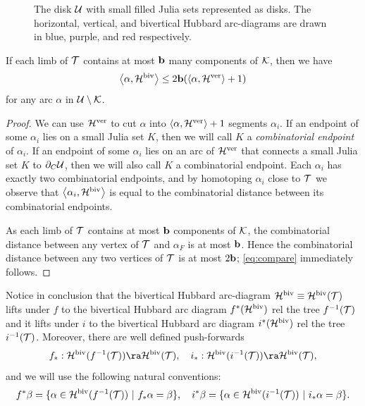 \documentclass[12pt]{amsart}
\begin{document}
\begin{figure}
	\begin{center}
		\def\svgwidth{4in}
		
		\caption{The disk $\mathcal U$ with small filled Julia sets represented as disks. The horizontal, vertical, and bivertical Hubbard arc-diagrams are drawn in blue, purple, and red respectively.}
		\label{arc-diagrams}
	\end{center}
\end{figure}
\begin{lemma} \label{lem:compare}
If each limb of $\mathcal T$ contains at most $\mathbf b$ many components of $\mathcal K$, then 
we have
\begin{equation} \label{eq:compare}
\left< \alpha, \mathcal H^{\mathrm{biv}} \right> \le 2\mathbf b (\left< \alpha, \mathcal H^{\mathrm{ver}} \right> + 1)
\end{equation}
for any arc $\alpha$ in $\mathcal U\setminus \mathcal K$.
\end{lemma}
\begin{proof}
We can use $\mathcal H^{\mathrm{ver}}$ to cut $\alpha$ into $\left< \alpha, \mathcal H^{\mathrm{ver}} \right> + 1$ segments $\alpha_i$. 
If an endpoint of some $\alpha_i$ lies on a small Julia set $K$, then we will call $K$ a  \emph{combinatorial endpoint} of $\alpha_i$. If an endpoint of some $\alpha_i$ lies on an arc of $\mathcal H^{\mathrm{ver}}$ that connects a small Julia set $K$ to $\partial_C \mathcal U$, then we will also call $K$ a combinatorial endpoint. 
Each $\alpha_i$ has exactly two combinatorial endpoints, and by homotoping $\alpha_i$ close to $\mathcal T$ we observe that  $\left< \alpha_i, \mathcal H^{\mathrm{biv}} \right>$ is equal to the combinatorial distance between its combinatorial endpoints. 


As each limb of $\mathcal T$ contains at most $\mathbf b$ components of $\mathcal K$, the combinatorial distance between any vertex of $\mathcal T$ and $\alpha_F$ is at most $\mathbf b$. Hence the combinatorial distance between any two vertices of $\mathcal T$ is at most $2\mathbf b$; \eqref{eq:compare} immediately follows. 
\end{proof}

{Notice in conclusion that the bivertical Hubbard arc-diagram $\mathcal H^{\mathrm{biv}} \equiv \mathcal H^{\mathrm{biv}} (\mathcal T)$ lifts
  under $f$ to  the bivertical Hubbard arc diagram  $f^* (\mathcal H^{\mathrm{biv}})$ rel the tree $f^{-1} (\mathcal T)$
and it lifts under $i$ to the bivertical Hubbard arc diagram  $i^* (\mathcal H^{\mathrm{biv}})$ rel the tree $i^{-1} (\mathcal T)$.
Moreover, there are well defined push-forwards  
$$ f_*: \HH^\biv(f^{-1} (\TT)) \ra \HH^\biv (\TT) ,  \quad  i_*: \HH^\biv(i^{-1} (\TT)) \ra \HH^\biv (\TT) , $$
and we will use the following natural conventions:
$$f^* \beta = \{\alpha \in \HH^\biv(f^{-1} (\TT)) \ | \ f_* \alpha = \beta\}, \quad
 i^* \beta = \{\alpha \in \HH^\biv(i^{-1} (\TT)) \ |\ i_* \alpha = \beta \} . $$
}
\end{document}
